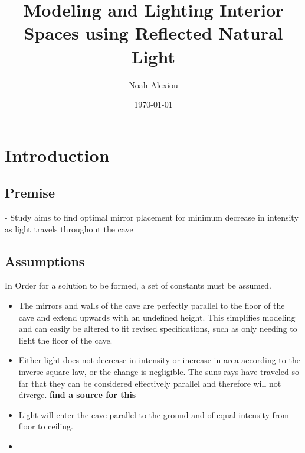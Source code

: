 \documentclass[11pt, letterpaper]{article}
\begin{document}
\title{Modeling and Lighting Interior Spaces using Reflected Natural Light}
\author{Noah Alexiou}
\date{\today}
\maketitle
\newpage
\tableofcontents
\newpage


\section{Introduction}


\subsection{Premise}
- Study aims to find optimal mirror placement for minimum decrease in intensity as light travels throughout the cave




\subsection{Assumptions}
\par
In Order for a solution to be formed, a set of constants must be assumed.
\begin{itemize}
	\item The mirrors and walls of the cave are perfectly parallel to the floor of the cave and extend upwards with an undefined height. This simplifies modeling and can easily be altered to fit revised specifications, such as only needing to light the floor of the cave.
	
	\item Either light does not decrease in intensity or increase in area according to the inverse square law, or the change is negligible. The suns rays have traveled so far that they can be considered effectively parallel and therefore will not diverge. 
	\textbf{find a source for this}
		
	\item Light will enter the cave parallel to the ground and of equal intensity from floor to ceiling.
	
	\item 
\end{itemize}
\end{document}
